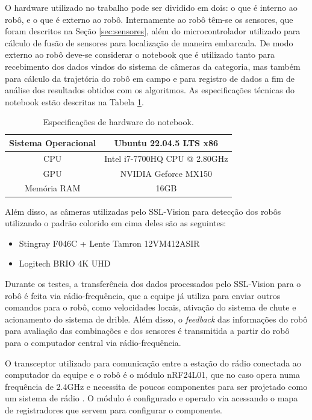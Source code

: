 \documentclass[acronym, symbols, table]{fei}
\begin{document}
		O hardware utilizado no trabalho pode ser dividido em dois: o que é interno ao robô, e o que é externo ao robô. Internamente ao robô têm-se os sensores, que foram descritos na Seção \ref{sec:sensores}, além do microcontrolador utilizado para cálculo de fusão de sensores para localização de maneira embarcada. De modo externo ao robô deve-se considerar o notebook que é utilizado tanto para recebimento dos dados vindos do sistema de câmeras da categoria, mas também para cálculo da trajetória do robô em campo e para registro de dados a fim de análise dos resultados obtidos com os algoritmos. As especificações técnicas do notebook estão descritas na Tabela \ref{tbl:especificacoes_notebook}.
		
		\begin{table}[!htb]
			\centering
			\caption{Especificações de hardware do notebook.}
			\label{tbl:especificacoes_notebook}
			\begin{tabular}{c c}
				\hline
				Sistema Operacional & Ubuntu 22.04.5 LTS x86\textunderscore64  \\ \hline
				CPU 				& Intel i7-7700HQ CPU @ 2.80GHz \\ \hline
				GPU 				& NVIDIA Geforce MX150 \\ \hline
				Memória RAM			& 16GB \\ \hline
			\end{tabular}
		\end{table}
	
		Além disso, as câmeras utilizadas pelo SSL-Vision para detecção dos robôs utilizando o padrão colorido em cima deles são as seguintes:
		
		\begin{itemize}
			\item Stingray F046C \cite{stingray_f046c} + Lente Tamron 12VM412ASIR
			\item Logitech BRIO 4K UHD \cite{logitech_brio}
		\end{itemize}
		
		Durante os testes, a transferência dos dados processados pelo SSL-Vision para o robô é feita via rádio-frequência, que a equipe já utiliza para enviar outros comandos para o robô, como velocidades locais, ativação do sistema de chute e acionamento do sistema de drible. Além disso, o \textit{feedback} das informações do robô para avaliação das combinações e dos sensores é transmitida a partir do robô para o computador central via rádio-frequência.
		
		O transceptor utilizado para comunicação entre a estação do rádio conectada ao computador da equipe e o robô é o módulo nRF24L01, que no caso opera numa frequência de 2.4GHz e necessita de poucos componentes para ser projetado como um sistema de rádio \cite{datasheet_nrf24}. O módulo é configurado e operado via  acessando o mapa de registradores que servem para configurar o componente.
		
\end{document}
